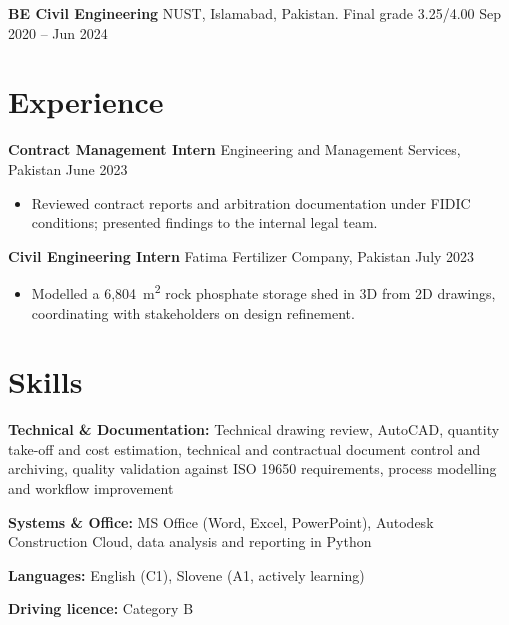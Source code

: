 \documentclass[a4paper,10.5pt]{article}
\newcommand{\datefill}{\dotfill}
\newcommand{\entry}[3]{\vspace{2.5pt}\noindent\textbf{#1} \textbar{} #2 \datefill{} #3\par\vspace{0.5pt}}
\newcommand{\skillrow}[2]{\noindent\textbf{#1:} #2\par\vspace{1pt}}
\begin{document}
\entry{BE Civil Engineering}{NUST, Islamabad, Pakistan. Final grade 3.25/4.00}{Sep 2020 -- Jun 2024}

\section{Experience}
\entry{Contract Management Intern}{Engineering and Management Services, Pakistan}{June 2023}
\begin{itemize}
  \item Reviewed contract reports and arbitration documentation under FIDIC
        conditions; presented findings to the internal legal team.
\end{itemize}

\entry{Civil Engineering Intern}{Fatima Fertilizer Company, Pakistan}{July 2023}
\begin{itemize}
  \item Modelled a 6,804~m\textsuperscript{2} rock phosphate storage shed in 3D from
        2D drawings, coordinating with stakeholders on design refinement.
\end{itemize}

\section{Skills}

\skillrow{Technical \& Documentation}{Technical drawing review, AutoCAD, quantity take-off and cost estimation, technical and contractual document control and archiving, quality validation against ISO 19650 requirements, process modelling and workflow improvement}
\skillrow{Systems \& Office}{MS Office (Word, Excel, PowerPoint), Autodesk Construction Cloud, data analysis and reporting in Python}

\skillrow{Languages}{English (C1), Slovene (A1, actively learning)}
\skillrow{Driving licence}{Category B}
\end{document}
